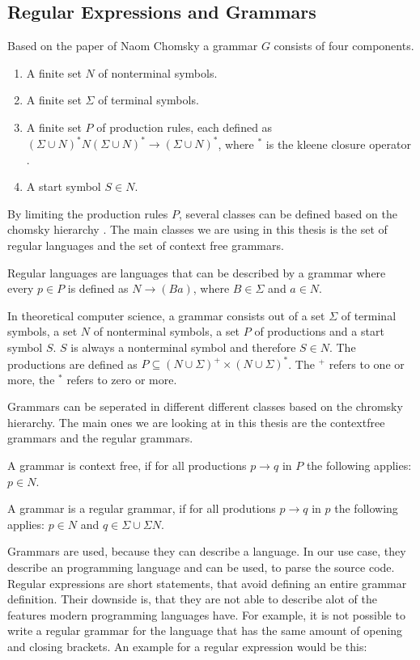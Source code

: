 \subsection{Regular Expressions and Grammars}

Based on the paper of Naom Chomsky \cite{chomsky} a grammar $G$ consists of four components. 

\begin{enumerate}
    \item A finite set $N$ of nonterminal symbols.
    \item A finite set $\Sigma$ of terminal symbols.
    \item A finite set $P$ of production rules, each defined as $(\Sigma \cup N)^*N(\Sigma \cup N)^* \rightarrow (\Sigma \cup N)^*$, where $^*$ is the kleene closure operator \cite{Appel2002-kleene}.
    \item A start symbol $S \in N$.
\end{enumerate}

By limiting the production rules $P$, several classes can be defined based on the chomsky hierarchy \cite{formal_languages_and_automata}.
The main classes we are using in this thesis is the set of regular languages and the set of context free grammars.

Regular languages are languages that can be described by a grammar where every $p \in P$ is defined as $N \rightarrow (Ba)$, where $B \in \Sigma$ and $a \in N$.

In theoretical computer science, a grammar consists out of a set $\Sigma$ of terminal symbols, a set $N$ of nonterminal symbols, a set $P$ of productions and a start symbol $S$. $S$ is always a nonterminal symbol and therefore $S \in N$. The productions are defined as $P \subseteq (N \cup \Sigma)^+ \times (N \cup \Sigma)^*$. The $^+$ refers to one or more, the $^*$ refers to zero or more.

Grammars can be seperated in different different classes based on the chromsky hierarchy. The main ones we are looking at in this thesis are the contextfree grammars and the regular grammars.

A grammar is context free, if for all productions $p \to q$ in $P$ the following applies: $p \in N$.

A grammar is a regular grammar, if for all produtions $p \to q$ in $p$ the following applies: $p \in N$ and $q \in \Sigma \cup \Sigma N$.

Grammars are used, because they can describe a language. In our use case, they describe an programming language and can be used, to parse the source code. Regular expressions are short statements, that avoid defining an entire grammar definition. Their downside is, that they are not able to describe alot of the features modern programming languages have. For example, it is not possible to write a regular grammar for the language that has the same amount of opening and closing brackets. An example for a regular expression would be this:

